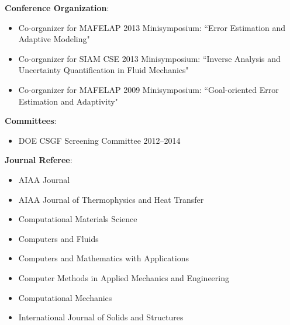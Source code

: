 \textbf{Conference Organization}:
\begin{itemize}
\itemsep 0pt
\item Co-organizer for MAFELAP 2013 Minisymposium: ``Error Estimation and Adaptive Modeling"
\item Co-organizer for SIAM CSE 2013 Minisymposium: ``Inverse Analysis and Uncertainty Quantification in Fluid Mechanics"
\item Co-organizer for MAFELAP 2009 Minisymposium: ``Goal-oriented Error Estimation and Adaptivity"
\end{itemize}

\blankline

\textbf{Committees}:
\begin{itemize}
\itemsep 0pt
\item DOE CSGF Screening Committee 2012--2014
\end{itemize}

\blankline


\textbf{Journal Referee}:
\begin{itemize}
\itemsep 0pt
\item AIAA Journal
\item AIAA Journal of Thermophysics and Heat Transfer
\item Computational Materials Science
\item Computers and Fluids
\item Computers and Mathematics with Applications
\item Computer Methods in Applied Mechanics and Engineering
\item Computational Mechanics
\item International Journal of Solids and Structures
\end{itemize}
